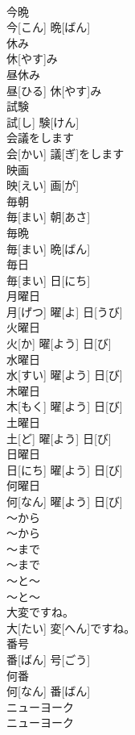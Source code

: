 \documentclass[8pt]{extreport}
\begin{document}
\begin{CJK}{UTF8}{min}
\\	今晩	
\\	今[こん] 晩[ばん]		
\\	休み	
\\	休[やす]み		
\\	昼休み	
\\	昼[ひる] 休[やす]み		
\\	試験	
\\	試[し] 験[けん]		
\\	会議をします	
\\	会[かい] 議[ぎ]をします		
\\	映画	
\\	映[えい] 画[が]		
\\	毎朝	
\\	毎[まい] 朝[あさ]		
\\	毎晩	
\\	毎[まい] 晩[ばん]		
\\	毎日	
\\	毎[まい] 日[にち]		
\\	月曜日	
\\	月[げつ] 曜[よ] 日[うび]		
\\	火曜日	
\\	火[か] 曜[よう] 日[び]		
\\	水曜日	
\\	水[すい] 曜[よう] 日[び]		
\\	木曜日	
\\	木[もく] 曜[よう] 日[び]		
\\	土曜日	
\\	土[ど] 曜[よう] 日[び]		
\\	日曜日	
\\	日[にち] 曜[よう] 日[び]		
\\	何曜日	
\\	何[なん] 曜[よう] 日[び]		
\\	～から	
\\	～から		
\\	～まで	
\\	～まで		
\\	～と～	
\\	～と～		
\\	大変ですね。	
\\	大[たい] 変[へん]ですね。		
\\	番号	
\\	番[ばん] 号[ごう]		
\\	何番	
\\	何[なん] 番[ばん]		
\\	ニューヨーク	
\\	ニューヨーク		

\end{CJK}
\end{document}
